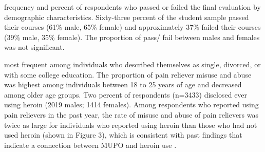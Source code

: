 \documentclass[sigconf]{acmart}
\begin{document}
frequency and percent of respondents who passed or
failed the final evaluation by demographic characteristics. Sixty-three percent 
of the student sample passed their courses (61\% male, 65\% female) and 
approximately 37\% failed their courses (39\% male, 35\% female). The 
proportion of pass/ fail between males and females was not significant. 

 most frequent among individuals who described 
themselves as single, divorced, or with some college education. The 
proportion of pain reliever misuse and abuse was highest among individuals 
between 18 to 25 years of age and decreased among older age groups. Two 
percent of respondents (n=3433) disclosed ever using heroin (2019 males; 
1414 females). Among respondents who reported using pain relievers in the 
past year, the rate of misuse and abuse of pain relievers was twice as 
large for individuals who reported using heroin than those who had not 
used heroin (shown in Figure 3), which is consistent with past findings 
that indicate a connection between MUPO and heroin use 
\cite{muhuri13, unick13}.

\end{document}

